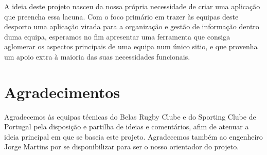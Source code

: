 \documentclass[a4paper,openright,twoside,11pt]{report}
\begin{document}
A ideia deste projeto nasceu da nossa própria necessidade de criar uma aplicação que preencha essa lacuna. Com o foco primário em trazer às equipas deste desporto uma aplicação virada para a organização e gestão de informação dentro duma equipa, esperamos no fim apresentar uma ferramenta que consiga aglomerar os aspectos principais de uma equipa num único sitio, e que provenha um apoio extra à maioria das suas necessidades funcionais.


\cleardoublepage
\chapter*{Agradecimentos}
Agradecemos às equipas técnicas do Belas Rugby Clube e do Sporting Clube de Portugal pela disposição e partilha de ideias e comentários, afim de atenuar a ideia principal em que se baseia este projeto. Agradecemos também ao engenheiro Jorge Martins por se disponibilizar para ser o nosso orientador do projeto.

\cleardoublepage
\tableofcontents \cleardoublepage


\setcounter{page}{1}













%
%

\appendix

\end{document}
